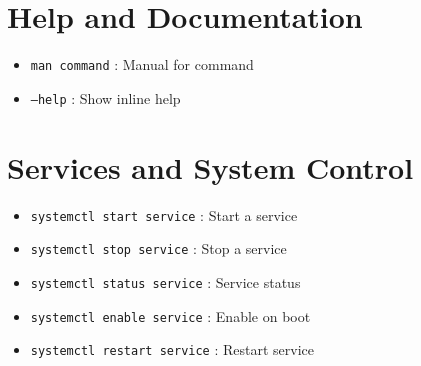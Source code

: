 \documentclass[12pt]{article}
\begin{document}
\begin{multicols}{2}
\section*{Help and Documentation}
\begin{itemize}[leftmargin=0.5cm]
  \item \texttt{man command} : Manual for command
  \item \texttt{--help} : Show inline help
\end{itemize}

\section*{Services and System Control}
\begin{itemize}[leftmargin=0.5cm]
  \item \texttt{systemctl start service} : Start a service
  \item \texttt{systemctl stop service} : Stop a service
  \item \texttt{systemctl status service} : Service status
  \item \texttt{systemctl enable service} : Enable on boot
  \item \texttt{systemctl restart service} : Restart service
\end{itemize}

\end{multicols}
\end{document}
